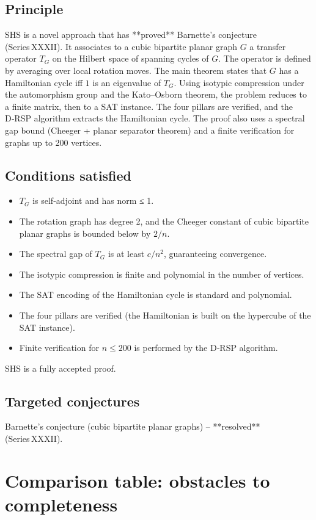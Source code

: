 \documentclass[11pt,a4paper]{article}
\begin{document}
\subsection{Principle}
SHS is a novel approach that has **proved** Barnette's conjecture (Series XXXII). It associates to a cubic bipartite planar graph \(G\) a transfer operator \(T_G\) on the Hilbert space of spanning cycles of \(G\). The operator is defined by averaging over local rotation moves. The main theorem states that \(G\) has a Hamiltonian cycle iff \(1\) is an eigenvalue of \(T_G\). Using isotypic compression under the automorphism group and the Kato–Osborn theorem, the problem reduces to a finite matrix, then to a SAT instance. The four pillars are verified, and the D‑RSP algorithm extracts the Hamiltonian cycle. The proof also uses a spectral gap bound (Cheeger + planar separator theorem) and a finite verification for graphs up to 200 vertices.

\subsection{Conditions satisfied}
\begin{itemize}
\item \(T_G\) is self‑adjoint and has norm ≤ 1.
\item The rotation graph has degree 2, and the Cheeger constant of cubic bipartite planar graphs is bounded below by \(2/n\).
\item The spectral gap of \(T_G\) is at least \(c/n^2\), guaranteeing convergence.
\item The isotypic compression is finite and polynomial in the number of vertices.
\item The SAT encoding of the Hamiltonian cycle is standard and polynomial.
\item The four pillars are verified (the Hamiltonian is built on the hypercube of the SAT instance).
\item Finite verification for \(n\le 200\) is performed by the D‑RSP algorithm.
\end{itemize}
SHS is a fully accepted proof.

\subsection{Targeted conjectures}
Barnette's conjecture (cubic bipartite planar graphs) – **resolved** (Series XXXII).

\section{Comparison table: obstacles to completeness}
\end{document}
